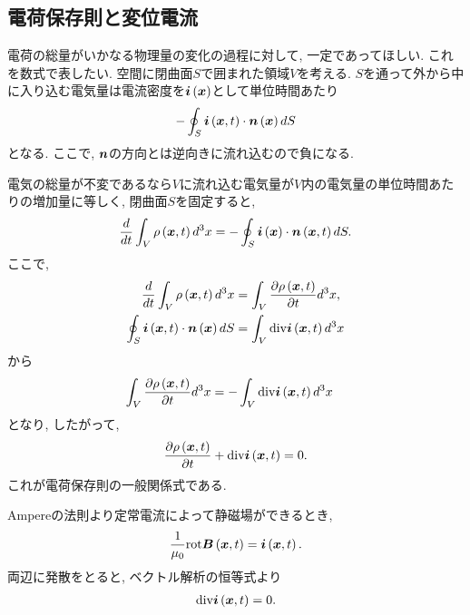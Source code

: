 \documentclass[10pt,a4paper]{jsarticle}
\begin{document}
\subsection{電荷保存則と変位電流}
電荷の総量がいかなる物理量の変化の過程に対して, 一定であってほしい. これを数式で表したい. 空間に閉曲面$S$で囲まれた領域$V$を考える. $S$を通って外から中に入り込む電気量は電流密度を$\bm{i} \left( \bm{x} \right)$として単位時間あたり
\begin{align*}
    - \oint_S \bm{i} \left( \bm{x}, t \right) \cdot \bm{n} \left( \bm{x} \right) dS 
\end{align*}
となる. ここで, $\bm{n} $の方向とは逆向きに流れ込むので負になる. \par
電気の総量が不変であるなら$V$に流れ込む電気量が$V$内の電気量の単位時間あたりの増加量に等しく, 閉曲面$S$を固定すると, 
\begin{align*}
    \frac{d}{dt} \int_V \rho \left( \bm{x}, t \right) d^3 x = - \oint_S \bm{i} \left( \bm{x} \right) \cdot \bm{n} \left( \bm{x}, t \right) dS.
\end{align*}
ここで, 
\begin{align*}
    \quad \frac{d}{dt} \int_V \rho \left( \bm{x}, t \right) d^3 x &= \int_V \frac{\partial \rho \left( \bm{x}, t \right)}{\partial t} d^3 x, \\
    \oint_S \bm{i} \left( \bm{x}, t \right) \cdot \bm{n} \left( \bm{x} \right) dS &= \int_V \mathrm{div} \bm{i} \left( \bm{x}, t \right) d^3 x
\end{align*}
から
\begin{align*}
    \int_V \frac{\partial \rho \left( \bm{x}, t \right)}{\partial t} d^3 x &= - \int_V \mathrm{div} \bm{i} \left( \bm{x}, t \right) d^3 x
\end{align*}
となり, したがって, 
\begin{align*}
    \frac{\partial \rho \left( \bm{x}, t \right)}{\partial t} + \mathrm{div} \bm{i} \left( \bm{x}, t \right) =0.
\end{align*}
これが電荷保存則の一般関係式である. \par
Ampereの法則より定常電流によって静磁場ができるとき, 
\begin{align*}
    \frac{1}{\mu_0 } \mathrm{rot} \bm{B} \left( \bm{x}, t \right) = \bm{i} \left( \bm{x}, t \right).
\end{align*}
両辺に発散をとると, ベクトル解析の恒等式より
\begin{align*}
    \mathrm{div} \bm{i} \left( \bm{x}, t \right) = 0.
\end{align*}\par
\end{document}
